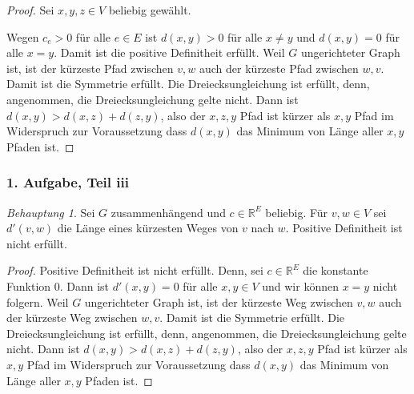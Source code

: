 \documentclass[draft,a5paper]{article}
\theoremstyle{remark}
\newtheorem*{beh}{Behauptung}
\begin{document}
\begin{proof}
  Sei \(x, y, z \in V\) beliebig gewählt.

  Wegen \(c_{e} > 0\) für alle \(e \in E\) ist \(d(x, y) > 0\) für alle
  \(x \ne y\) und \(d(x, y) = 0\) für alle \(x = y\).  Damit ist die
  positive Definitheit erfüllt.  Weil \(G\) ungerichteter Graph ist,
  ist der kürzeste Pfad zwischen \(v, w\) auch der kürzeste Pfad
  zwischen \(w, v\).  Damit ist die Symmetrie erfüllt.  Die
  Dreiecksungleichung ist erfüllt, denn, angenommen, die
  Dreiecksungleichung gelte nicht.  Dann ist
  \(d(x, y) > d(x, z) + d(z, y)\), also der \(x,z,y\) Pfad ist kürzer
  als \(x,y\) Pfad im Widerspruch zur Voraussetzung dass \(d(x,y)\)
  das Minimum von Länge aller \(x, y\) Pfaden ist.
\end{proof}

\subsubsection*{1. Aufgabe, Teil iii}

\begin{beh}
  Sei \(G\) zusammenhängend und \(c \in \mathbb{R}^{E}\) beliebig.  Für \(v, w \in
  V\) sei \(d'(v, w)\) die Länge eines kürzesten Weges von \(v\) nach
  \(w\).  Positive Definitheit ist nicht erfüllt.
\end{beh}

\begin{proof}
  Positive Definitheit ist nicht erfüllt.  Denn, sei
  \(c \in \mathbb{R}^{E}\) die konstante Funktion \(0\).  Dann ist
  \(d'(x, y) = 0\) für alle \(x, y \in V\) und wir können \(x = y\)
  nicht folgern.  Weil \(G\) ungerichteter Graph ist, ist der kürzeste
  Weg zwischen \(v, w\) auch der kürzeste Weg zwischen \(w, v\).
  Damit ist die Symmetrie erfüllt.  Die
  Dreiecksungleichung ist erfüllt, denn, angenommen, die
  Dreiecksungleichung gelte nicht.  Dann ist
  \(d(x, y) > d(x, z) + d(z, y)\), also der \(x,z,y\) Pfad ist kürzer
  als \(x,y\) Pfad im Widerspruch zur Voraussetzung dass \(d(x,y)\)
  das Minimum von Länge aller \(x, y\) Pfaden ist.
\end{proof}
\end{document}
